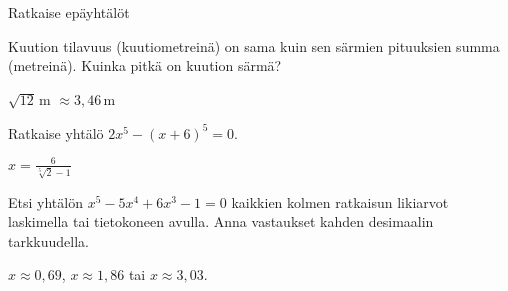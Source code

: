 \begin{tehtavasivu}
\begin{tehtava} 
Ratkaise epäyhtälöt
     \begin{vastaus}
    \end{vastaus}
\end{tehtava}

\begin{tehtava} 
Kuution tilavuus (kuutiometreinä) on sama kuin sen särmien pituuksien summa (metreinä). Kuinka pitkä on kuution särmä?
    \begin{vastaus}
		$\sqrt{12}$\,m $\approx 3,46$\,m
    \end{vastaus}
\end{tehtava}

\begin{tehtava} 
Ratkaise yhtälö $2x^5-(x+6)^5=0$.
    \begin{vastaus}
	$x=\frac{6}{\sqrt[5]{2}-1}$
    \end{vastaus}
\end{tehtava}

\begin{tehtava}
Etsi yhtälön $x^5-5x^4+6x^3-1=0$ kaikkien kolmen ratkaisun likiarvot laskimella tai tietokoneen avulla. Anna vastaukset kahden desimaalin tarkkuudella.
    \begin{vastaus}
	$x \approx 0,69$, $x \approx 1,86$ tai $x \approx 3,03$.
    \end{vastaus}
\end{tehtava}

\end{tehtavasivu}